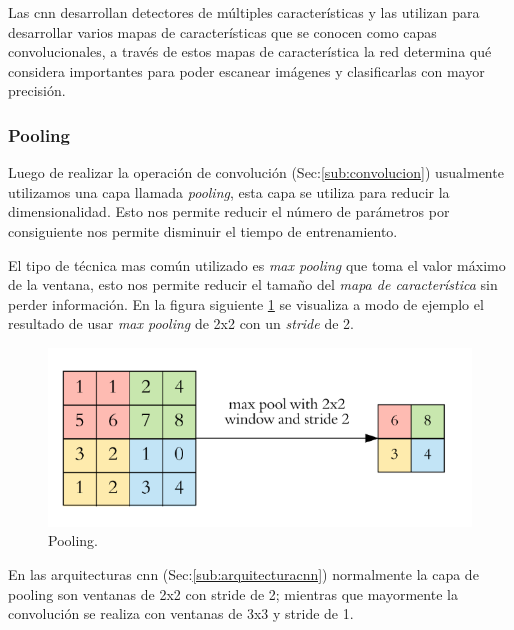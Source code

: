 Las \ac{cnn} desarrollan detectores de múltiples características y las utilizan para desarrollar varios mapas de características que se conocen como capas convolucionales, a través de estos mapas de característica la red determina qué  considera importantes para poder escanear imágenes y clasificarlas con mayor precisión.
\subsubsection{Pooling}\label{sub:pooling}

Luego de realizar la operación de convolución (Sec:\ref{sub:convolucion}) usualmente utilizamos una capa llamada \textit{pooling}, esta capa se utiliza para reducir la dimensionalidad. Esto nos permite reducir el número de parámetros por consiguiente nos permite disminuir el tiempo de entrenamiento.

El tipo de técnica mas común utilizado es \textit{max pooling} que toma el valor máximo de la ventana, esto nos permite reducir el tamaño del \textit{mapa de característica} sin perder información. En la figura siguiente \ref{Fig:Pooling} se visualiza a modo de ejemplo el resultado de usar \textit{max pooling} de 2x2 con un \textit{stride} de 2.

\begin{figure}[H]
 \centering
  \includegraphics[scale=0.4,keepaspectratio=true,clip=true]{imagenes/MarcoTeorico/pooling_1.png}
  \caption{Pooling.} \label{Fig:Pooling}%
\end{figure}

En las arquitecturas \ac{cnn} (Sec:\ref{sub:arquitecturacnn}) normalmente la capa de pooling son ventanas de 2x2 con stride de 2; mientras que mayormente la convolución se realiza con ventanas de 3x3 y stride de 1. 

